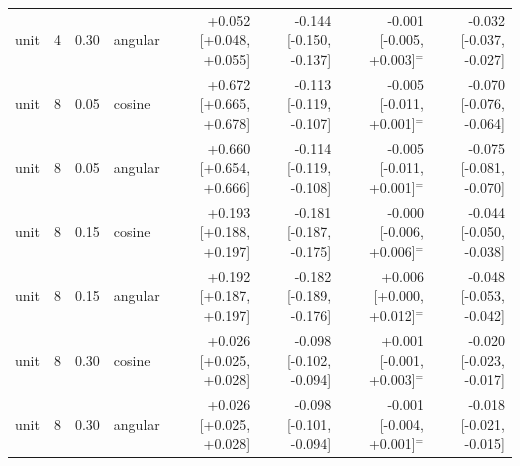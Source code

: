 \begin{tabular}{lrrlrrrr}
unit & 4 & 0.30 & angular & +0.052 [+0.048, +0.055] & -0.144 [-0.150, -0.137] & -0.001 [-0.005, +0.003]$^{=}$ & -0.032 [-0.037, -0.027] \\
unit & 8 & 0.05 & cosine & +0.672 [+0.665, +0.678] & -0.113 [-0.119, -0.107] & -0.005 [-0.011, +0.001]$^{=}$ & -0.070 [-0.076, -0.064] \\
unit & 8 & 0.05 & angular & +0.660 [+0.654, +0.666] & -0.114 [-0.119, -0.108] & -0.005 [-0.011, +0.001]$^{=}$ & -0.075 [-0.081, -0.070] \\
unit & 8 & 0.15 & cosine & +0.193 [+0.188, +0.197] & -0.181 [-0.187, -0.175] & -0.000 [-0.006, +0.006]$^{=}$ & -0.044 [-0.050, -0.038] \\
unit & 8 & 0.15 & angular & +0.192 [+0.187, +0.197] & -0.182 [-0.189, -0.176] & +0.006 [+0.000, +0.012]$^{=}$ & -0.048 [-0.053, -0.042] \\
unit & 8 & 0.30 & cosine & +0.026 [+0.025, +0.028] & -0.098 [-0.102, -0.094] & +0.001 [-0.001, +0.003]$^{=}$ & -0.020 [-0.023, -0.017] \\
unit & 8 & 0.30 & angular & +0.026 [+0.025, +0.028] & -0.098 [-0.101, -0.094] & -0.001 [-0.004, +0.001]$^{=}$ & -0.018 [-0.021, -0.015] \\
\bottomrule
\end{tabular}
